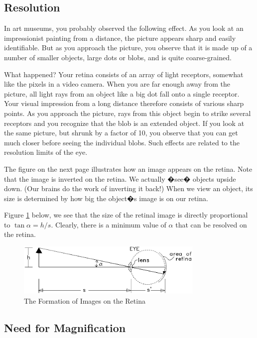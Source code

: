 \subsection{Resolution}
In art museums, you probably observed the following effect. As you look at an impressionist painting from a distance, the picture appears sharp and easily identifiable. But as you approach the picture, you observe that it is made up of a number of smaller objects, large dots or blobs, and is quite coarse-grained.\myskip

What happened? Your retina consists of an array of light receptors, somewhat like the pixels in a video camera. When you are far enough away from the picture, all light rays from an object like a big dot fall onto a single receptor. Your visual impression from a long distance therefore consists of various sharp points. As you approach the picture, rays from this object begin to strike several receptors and you recognize that the blob is an extended object. If you look at the same picture, but shrunk by a factor of 10, you observe that you can get much closer before seeing the individual blobs. Such effects are related to the resolution limits of the eye.\myskip

The figure on the next page illustrates how an image appears on the retina. Note that the image is inverted on the retina. We actually �see� objects upside down. (Our brains do the work of inverting it back!) When we view an object, its size is determined by how big the object�s image is on our retina. \myskip

Figure \ref{fig:resolution} below, we see that the size of the retinal image is directly proportional to $\tan\alpha=h/s$. Clearly, there is a minimum value of $\alpha$ that can be resolved on the retina.
\begin{figure}[h]
\centering
\includegraphics[width=0.8\textwidth]{./Exp7/pic/image1.png}
\caption{The Formation of Images on the Retina}
\label{fig:resolution}
\end{figure}


\subsection{Need for Magnification}

